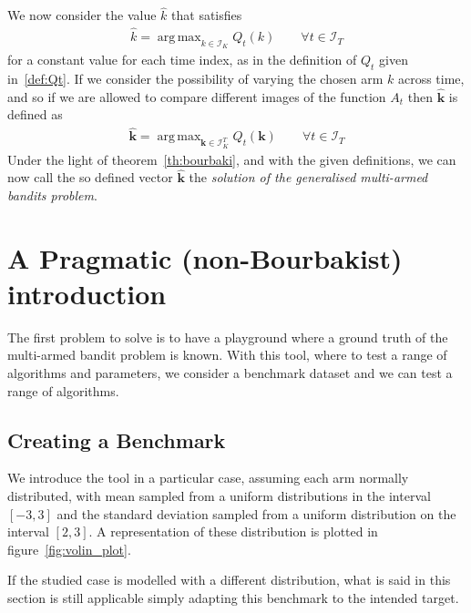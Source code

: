 \documentclass[]{scrartcl}
\DeclareMathOperator*{\argmax}{arg\,max}
\theoremstyle{definition}
\begin{document}
We now consider the value $\hat{k}$ that satisfies
\begin{align*}
\hat{k} = \argmax_{k \in \mathcal{I}_K} Q_t(k)
\qquad
\forall t \in \mathcal{I}_T
\end{align*}
for a constant value for each time index, as in the definition of $Q_t$ given in~\ref{def:Qt}.
If we consider the possibility of varying the chosen arm $k$ across time, and so if we are allowed to compare different images of the function $A_t$ then $\hat{\mathbf{k}}$ is defined as
\begin{align}\label{eq:bourbaki_solution}
\hat{\mathbf{k}}
=
\argmax_{\mathbf{k} \in \mathcal{I}_K^{T}} Q_t(\mathbf{k})
\qquad
\forall t \in \mathcal{I}_T
\end{align}
Under the light of theorem~\ref{th:bourbaki}, and with the given definitions, we can now call the so defined vector $\hat{\mathbf{k}}$ the \emph{solution of the generalised multi-armed bandits problem}.

\section{A Pragmatic (non-Bourbakist) introduction}
\label{se:pragmatic_perspective}

The first problem to solve is to have a playground where a ground truth of the multi-armed bandit problem is known. With this tool, where to test a range of algorithms and parameters, we consider a benchmark dataset and we can test a range of algorithms.

\subsection*{Creating a Benchmark}

We introduce the tool in a particular case, assuming each arm normally distributed, with mean sampled from a uniform distributions in the interval $[-3, 3]$ and the standard deviation sampled from a uniform distribution on the interval $[2, 3]$. A representation of these distribution is plotted in
figure~\ref{fig:volin_plot}.

If the studied case is modelled with a different distribution, what is said in this section is still applicable simply adapting this benchmark to the intended target.
\end{document}
